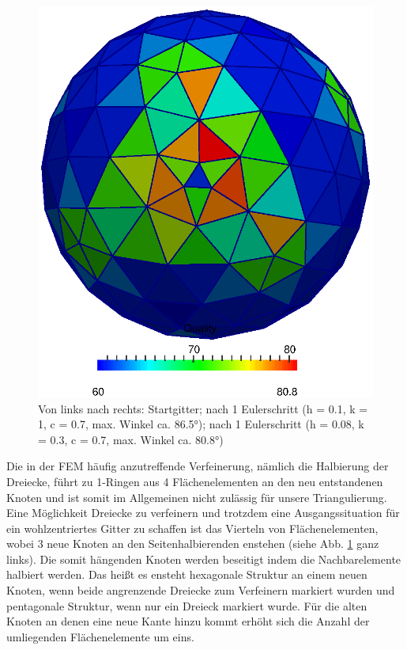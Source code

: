 \begin{figure}
\begin{minipage}[t]{0.32\textwidth}
        \end{minipage}
        \begin{minipage}[t]{0.32\textwidth}
        \includegraphics[width=\textwidth]{bilder/meshCorrector/sphereDivBy4AfterH008K03C07_1Step.eps}
        \end{minipage}
        \hfill
        \caption[Gittergenerierung: Lokale Verfeinerung]
                 {Von links nach rechts: 
                 Startgitter; 
                 nach 1 Eulerschritt (h = 0.1, k = 1, c = 0.7, max. Winkel ca. \ang{86.5});
                 nach 1 Eulerschritt (h = 0.08, k = 0.3, c = 0.7, max. Winkel ca. \ang{80.8})}
         \label{AbbVerfeinerung}
      \end{figure}

      Die in der FEM häufig anzutreffende Verfeinerung, nämlich die Halbierung der Dreiecke, führt zu 1-Ringen aus 4 Flächenelementen an den neu
      entstandenen Knoten und ist somit im Allgemeinen nicht zulässig für unsere Triangulierung.
      Eine Möglichkeit Dreiecke zu verfeinern und trotzdem eine Ausgangssituation für ein wohlzentriertes Gitter zu schaffen ist das Vierteln von
      Flächenelementen, wobei 3 neue Knoten an den Seitenhalbierenden enstehen (siehe Abb. \ref{AbbVerfeinerung} ganz links). 
      Die somit hängenden Knoten werden beseitigt indem die Nachbarelemente halbiert werden.
      Das heißt es ensteht hexagonale Struktur an einem neuen Knoten, wenn beide angrenzende Dreiecke zum Verfeinern markiert wurden und
      pentagonale Struktur, wenn nur ein Dreieck markiert wurde. Für die alten Knoten an denen eine neue Kante hinzu kommt erhöht sich die Anzahl
      der umliegenden Flächenelemente um eins.

